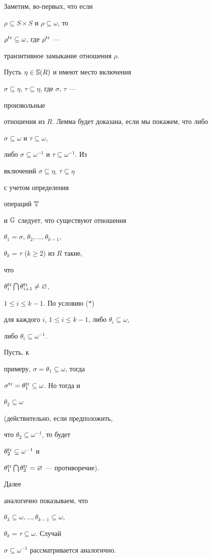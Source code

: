 \begin{pf}


Заметим, во-первых, что если


$\rho\subseteq S\times S$ и $\rho\subseteq\omega$, то


$\rho^{\mathrm{tr}}\subseteq\omega$, где $\rho^{\mathrm{tr}}$ ---


транзитивное замыкание отношения $\rho$.





Пусть $\eta\in\Bbb S(R)$ и имеют место включения


$\sigma\subseteq\eta$, $\tau\subseteq\eta$, где $\sigma$, $\tau$ ---


произвольные


отношения из $R$. Лемма будет доказана, если мы покажем, что либо


$\sigma\subseteq\omega$ и $\tau\subseteq\omega$,


либо $\sigma\subseteq\omega^{-1}$ и $\tau\subseteq\omega^{-1}$. Из


включений $\sigma\subseteq\eta$, $\tau\subseteq\eta$


с учетом определения


операций $\Bbb T$


и $\Bbb G$ следует, что существуют отношения


$\theta_1=\sigma$, $\theta_2,\dotsc,\theta_{k-1}$,


$\theta_k=\tau$ ($k\ge 2$) из $R$ такие,


что


$\theta^{\mathrm{tr}}_i\bigcap\theta^{\mathrm{tr}}_{i+1}\ne\varnothing$,


$1\le i\le k-1$. По условию ($\ast$)


для каждого $i$, $1\le i\le k-1$, либо $\theta_i\subseteq\omega$,


либо $\theta_i\subseteq\omega^{-1}$.


Пусть, к


примеру, $\sigma=\theta_1\subseteq\omega$, тогда


$\sigma^{\mathrm{tr}}=\theta^{\mathrm{tr}}_1\subseteq\omega$. Но тогда и


$\theta_2\subseteq\omega$


(действительно, если предположить,


что $\theta_2\subseteq\omega^{-1}$, то будет


$\theta^{\mathrm{tr}}_2\subseteq\omega^{-1}$ и


$\theta^{\mathrm{tr}}_1\bigcap\theta^{\mathrm{tr}}_2=\varnothing$ --- противоречие).


Далее


аналогично показываем, что


$\theta_3\subseteq\omega,\dotsc,\theta_{k-1}\subseteq\omega$,


$\theta_k=\tau\subseteq\omega$. Случай


$\sigma\subseteq\omega^{-1}$ рассматривается аналогично.


\end{pf}





